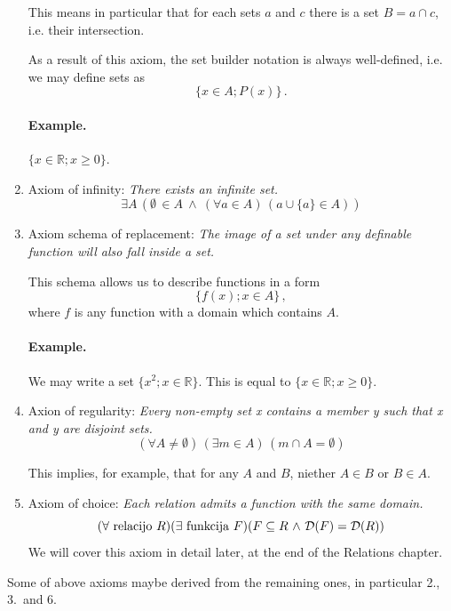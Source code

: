 \documentclass[11pt,paper=b5,footinclude,headinclude]{scrbook} %
\def\inn {{~\wedge~}}
\def\sledi {{~\Rightarrow~}}
\def\cee {{~\Leftrightarrow~}}
\theoremstyle{remark}
\theoremstyle{definition} %
\theoremstyle{theorem} %
\begin{document}
\begin{enumerate}
	This means in particular that for each sets $a$ and $c$ there is a set  $B = a\cap c$, i.e. their intersection.
	
	\medskip
	As a result of this axiom, the set builder notation is always well-defined, i.e. we may define sets as
	$$\{x\in A; P(x)\}\,.$$
	
	\paragraph{Example.} $\{x\in \mathbb{R}; x\ge 0\}$.
	
	\item Axiom of infinity: \emph{ There exists an infinite set.}
	$$\exists A\,(\emptyset \,\in A \inn (\forall a\in A)\, (a\cup \{a\}\in A))$$
	

	
	\item Axiom schema of replacement: \emph{ The image of a set under any definable function will also fall inside a set.}
	
	This schema allows us to describe functions in a form
	$$\{f(x); x\in A\}\,,$$
	where $f$ is any function with a domain which contains $A$.
	
	\paragraph{Example.} We may write a set $\{x^2; x\in \mathbb{R}\}$. This is equal to $\{x\in \mathbb{R}; x\ge 0\}$.
	
	
	\item Axion of regularity: \emph{ Every non-empty set x contains a member y such that x and y are disjoint sets.}
	$$(\forall A\neq \emptyset)\,(\exists m\in A)\,(m\cap A = \emptyset)$$
	
	This implies, for example, that for any $A$ and $B$,  niether $A\in B$ or $B\in A$.


	\item Axiom of choice: \emph{ Each relation admits a function with the same domain.}
	$$(\forall \textrm{ relacijo }R)(\exists \textrm{ funkcija }F)(F\subseteq R \inn {\cal D}(F) = {\cal D}(R))$$
	We will cover this axiom in detail later, at the end of the Relations chapter.
\end{enumerate}
\noindent Some of above axioms maybe derived from the remaining ones, in particular 2., 3.~and 6.
\end{document}
